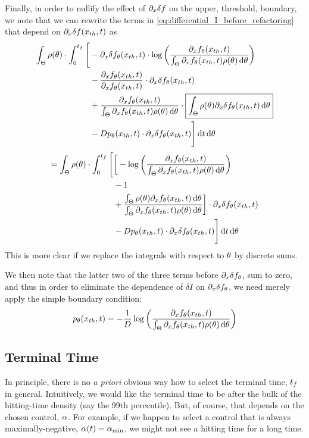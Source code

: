 Finally, in order to nullify the effect of ${\partial}_x \delta f$ on the upper,
threshold, boundary, we note that we can rewrite the terms in
\cref{eq:differential_I_before_refactoring} that depend on ${\partial}_x \delta
f({ x_{th} }, t)$ as
\begin{align*}
\int_\Theta  \rho({ \theta})\cdot \int_0^{{t_f}} \Bigg[ 
&-   {\partial}_x \delta f_{ \theta}({ x_{th} }, t)  \cdot 
		\log \left( \frac{{\partial}_xf_{ \theta}({ x_{th} }, t)}
						{\int_\Theta {\partial}_xf_{ \theta}({ x_{th} }, t)\rho({ \theta})\, \mathrm{d} { \theta} } \right)
\\ 
	&-  \frac{ {\partial}_x f_{ \theta}({ x_{th} }, t)}{ {\partial}_x f_{ \theta}({ x_{th} }, t)}  \cdot {\partial}_x
		\delta f_{ \theta}({ x_{th} }, t)
\\ 
	&+    \frac{ {\partial}_x f_{ \theta}({ x_{th} }, t)}{	{\int_\Theta {\partial}_xf_{ \theta}({ x_{th} },
	t)\rho({ \theta})\, \mathrm{d} { \theta} }} \cdot
		 \boxed{\int_\Theta \rho({ \theta}) {\partial}_x \delta f_{ \theta}({ x_{th} }, t) 	\, \mathrm{d} { \theta}}				 
\\ 
 &-   D p_{ \theta}({ x_{th} },t) \cdot {\partial}_x\delta f_{ \theta}({ x_{th} },t) \Bigg] \, \mathrm{d} t	\, \mathrm{d} { \theta}	   
 \end{align*}
 \begin{align*}
 =
 \int_\Theta  \rho({ \theta})\cdot \int_0^{{t_f}} \Bigg[ 
& \bigg[ - \log \left( \frac{{\partial}_xf_{ \theta}({ x_{th} }, t)}
						{\int_\Theta {\partial}_xf_{ \theta}({ x_{th} }, t)\rho({ \theta})\, \mathrm{d} { \theta} } \right)
\\ 
	&- 1
\\ 
	&+    \frac{ \int_\Theta \rho({ \theta}){\partial}_x f_{ \theta}({ x_{th} }, t)\, \mathrm{d} { \theta}}
	     		{	{\int_\Theta {\partial}_xf_{ \theta}({ x_{th} },	t)\rho({ \theta})\, \mathrm{d} { \theta} }} 
		 \bigg]  \cdot {\partial}_x \delta f_{ \theta}({ x_{th} }, t)				 
\\ 
 &-   D p_{ \theta}({ x_{th} },t) \cdot {\partial}_x\delta f_{ \theta}({ x_{th} },t) \Bigg] \, \mathrm{d} t	\, \mathrm{d} { \theta}
\end{align*}
This is more clear if we replace the integrals with respect to ${ \theta}$ by discrete
sums. 

We then note that the latter two of the three terms before ${\partial}_x \delta
f_{ \theta}$, sum to zero, and thus in order to eliminate the dependence of  $\delta
I$ on ${\partial}_x \delta f_{ \theta}$, we need merely apply the simple boundary
condition: 
$$ p_{ \theta}({ x_{th} },t) = - \frac 1D \log\left( \frac{{\partial}_xf_{ \theta}({ x_{th} }, t)}
						{\int_\Theta {\partial}_xf_{ \theta}({ x_{th} }, t)\rho({ \theta})\, \mathrm{d} { \theta} } \right) $$

\subsection{Terminal Time}
In principle, there is no {\sl a priori} obvious way how to select the terminal
time, ${t_f}$ in general. Intuitively, we would like the terminal time to be after
the bulk of the hitting-time density (say the 99th percentile). But, of course,
that depends on the chosen control, $\alpha$. For example, if we happen to select a
control that is always maximally-negative, $\alpha(t) = { \alpha_{\textrm{min}} }$, we might not see a
hitting time for a long time.

